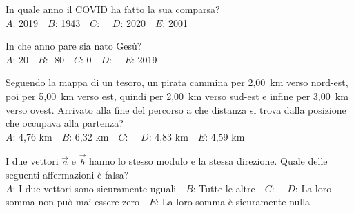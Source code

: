 \def\mcquestionnumber{5}


\mcquestionheader In quale anno il COVID ha fatto la sua comparsa?\\
{$A$}: 2019\ \ {$B$}: 1943\ \ {$C$}: \ \ {$D$}: 2020\ \ {$E$}: 2001\ \ 

\mcquestionfooter



\def\mcquestionnumber{6}


\mcquestionheader In che anno pare sia nato Gesù?\\
{$A$}: 20\ \ {$B$}: -80\ \ {$C$}: 0\ \ {$D$}: \ \ {$E$}: 2019\ \ 

\mcquestionfooter



\def\mcquestionnumber{7}


\mcquestionheader Seguendo la mappa di un tesoro, un pirata cammina per 2,00~km verso nord-est, poi per 5,00~km verso est, quindi per 2,00~km verso sud-est e infine per 3,00~km verso ovest. Arrivato alla fine del percorso a che distanza si trova dalla posizione che occupava alla partenza?\\
{$A$}: 4,76 km\ \ {$B$}: 6,32 km\ \ {$C$}: \ \ {$D$}: 4,83 km\ \ {$E$}: 4,59 km\ \ 

\mcquestionfooter



\def\mcquestionnumber{8}


\mcquestionheader I due vettori $\vec{a}$ e $\vec{b}$ hanno lo stesso modulo e la stessa direzione. Quale delle seguenti affermazioni è falsa?\\
{$A$}: I due vettori sono sicuramente uguali\ \ {$B$}: Tutte le altre\ \ {$C$}: \ \ {$D$}: La loro somma non può mai essere zero\ \ {$E$}: La loro somma è sicuramente nulla\ \ 

\mcquestionfooter



\def\mcquestionnumber{9}


